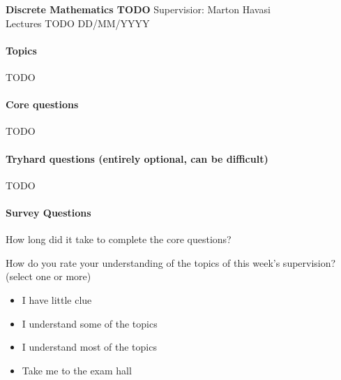 \documentclass{exam}
\begin{document}
\noindent
\large\textbf{Discrete Mathematics TODO} \hfill Supervisior: Marton Havasi \\
\normalsize Lectures TODO \hfill DD/MM/YYYY
\paragraph{Topics}

TODO

\paragraph{Core questions}
\begin{questions}
\question TODO
\end{questions}

\paragraph{Tryhard questions (entirely optional, can be difficult)}
\begin{questions}
\question TODO
\end{questions}

\paragraph{Survey Questions}
\begin{questions}
\question How long did it take to complete the core questions?
 
\question How do you rate your understanding of the topics of this week's supervision? (select one or more)

\begin{itemize}
\item
I have little clue
\item 
I understand some of the topics
\item
I understand most of the topics
\item
Take me to the exam hall
\end{itemize}
\end{questions}
\end{document}
